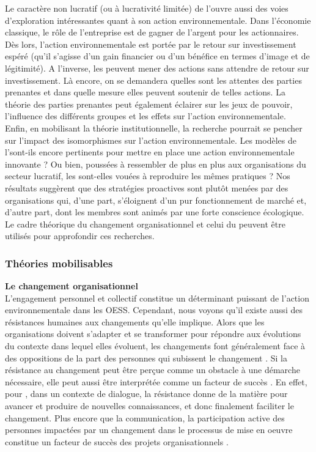             Le caractère non lucratif (ou à lucrativité limitée) de l'\ess ouvre aussi des voies d'exploration intéressantes quant à son action environnementale. Dans l'économie classique, le rôle de l'entreprise est de gagner de l'argent pour les actionnaires. Dès lors, l'action environnementale est portée par le retour sur investissement espéré (qu'il s'agisse d'un gain financier ou d'un bénéfice en termes d'image et de légitimité). A l'inverse, les \oess peuvent mener des actions sans attendre de retour sur investissement. Là encore, on se demandera quelles sont les attentes des parties prenantes et dans quelle mesure elles peuvent soutenir de telles actions. La théorie des parties prenantes peut également éclairer sur les jeux de pouvoir, l'influence des différents groupes et les effets sur l'action environnementale. \\

            Enfin, en mobilisant la théorie institutionnelle, la recherche pourrait se pencher sur l'impact des isomorphismes sur l'action environnementale. Les modèles de l'\ess sont-ils encore pertinents pour mettre en place une action environnementale innovante ? Ou bien, poussées à ressembler de plus en plus aux organisations du secteur lucratif, les \oess sont-elles vouées à reproduire les mêmes pratiques ? Nos résultats suggèrent que des stratégies proactives sont plutôt menées par des organisations qui, d'une part, s'éloignent d'un pur fonctionnement de marché et, d'autre part, dont les membres sont animés par une forte conscience écologique. \\

            Le cadre théorique du changement organisationnel et celui du  peuvent être utilisés pour approfondir ces recherches.

        \subsubsection{Théories mobilisables}
        \textbf{Le changement organisationnel} \\
            L'engagement personnel et collectif constitue un déterminant puissant de l'action environnementale dans les OESS. Cependant, nous voyons qu'il existe aussi des résistances humaines aux changements qu'elle implique. Alors que les organisations doivent s'adapter et se transformer pour répondre aux évolutions du contexte dans lequel elles évoluent, les changements font généralement face à des oppositions de la part des personnes qui subissent le changement \parencite{mariaux2011impact, thomas2011reframing, lines2004influence}.  Si la résistance au changement peut être perçue comme un obstacle à une démarche nécessaire, elle peut aussi être interprétée comme un facteur de succès \parencite{thomas2011reframing}. En effet, pour \textcite{thomas2011managing}, dans un contexte de dialogue, la résistance donne de la matière pour avancer et produire de nouvelles connaissances, et donc finalement faciliter le changement. Plus encore que la communication, la participation active des personnes impactées par un changement dans le processus de mise en oeuvre constitue un facteur de succès des projets organisationnels \parencite{lines2004influence}. \\

